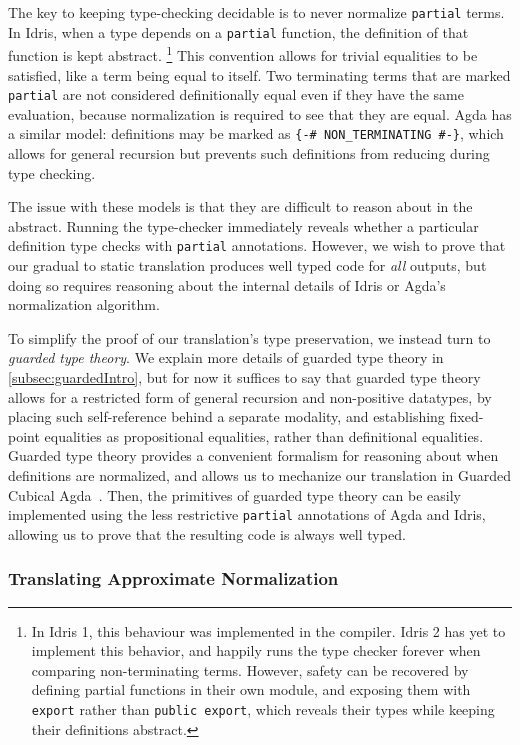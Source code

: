 The key to keeping type-checking decidable is to never normalize \texttt{partial} terms.
In Idris, when a type depends on a \texttt{partial} function, the definition of that function
is kept abstract.%
\footnote{
  In Idris 1, this behaviour was implemented in the compiler. Idris 2 has yet to implement
  this behavior, and happily runs the type checker forever when comparing non-terminating terms.
  However, safety can be recovered by defining partial functions in their own module,
  and exposing them with \texttt{export} rather than \texttt{public export}, which reveals
  their types while keeping their definitions abstract.
}%
%
This convention allows for trivial equalities to be satisfied, like a term being equal to itself.
Two terminating terms that are marked \texttt{partial} are not considered definitionally equal
even if they have the same evaluation, because normalization is required to see
that they are equal.
Agda has a similar model: definitions may be marked as \texttt{\{-\# NON\_TERMINATING \#-\}},
which allows for general recursion but prevents such definitions from reducing during type checking.

The issue with these models is that they are difficult to reason about in the abstract.
Running the type-checker immediately reveals whether a particular definition type checks with \texttt{partial} annotations. However, we wish to prove that our gradual to static translation
produces well typed code for \textit{all} outputs, but doing so requires reasoning about
the internal details of Idris or Agda's normalization algorithm.

To simplify the proof of our translation's type preservation, we instead turn to
\textit{guarded type theory}. We explain more details of guarded type theory in \cref{subsec:guardedIntro},
but for now it suffices to say that guarded type theory allows for a restricted form of general
recursion and non-positive datatypes, by placing such self-reference behind a separate modality,
and establishing fixed-point equalities as propositional equalities, rather than definitional equalities.
Guarded type theory provides a convenient formalism for reasoning about when definitions are normalized,
and allows us to mechanize our translation in Guarded Cubical Agda~\citet{TODO}.
Then, the primitives of guarded type theory can be easily implemented using the less restrictive
\texttt{partial} annotations of Agda and Idris,
allowing us to prove that the resulting code is always well typed.

\subsubsection{Translating Approximate Normalization}


